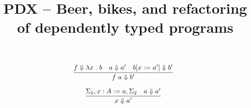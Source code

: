 \documentclass{article}
\title{PDX -- Beer, bikes, and refactoring of dependently typed programs}
\begin{document}
\maketitle

$$
\infer
  []
  {\whnf{\app{f}{a}}{b'}}
{
  \whnf{f}{\lam{x}{b}}
  &
  \whnf{a}{a'}
  &
  \whnf{\sub{b}{x}{a'}}{b'}
}
$$

$$
\infer
  []
  {\whnf{x}{a'}}
{
  \Sigma_1, \sigd{x}{A}{a}, \Sigma_2
  &
  \whnf{a}{a'}
}
$$
\end{document}
